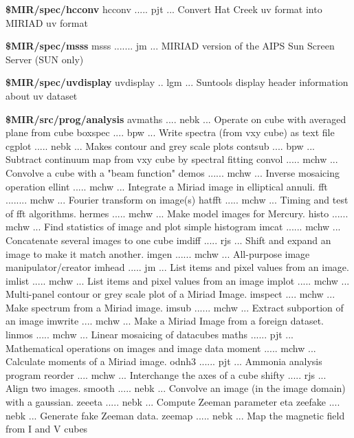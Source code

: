\par{\bf \$MIR/spec/hcconv}
{\eightpoint\begintt
hcconv ..... pjt  ... Convert Hat Creek uv format into MIRIAD uv format 
\endtt}
\par{\bf \$MIR/spec/msss}
{\eightpoint\begintt
msss ....... jm   ... MIRIAD version of the AIPS Sun Screen Server (SUN only) 
\endtt}
\par{\bf \$MIR/spec/uvdisplay}
{\eightpoint\begintt
uvdisplay .. lgm  ... Suntools display header information about uv dataset 
\endtt}
\par{\bf \$MIR/src/prog/analysis}
{\eightpoint\begintt
avmaths .... nebk ... Operate on cube with averaged plane from cube 
boxspec .... bpw  ... Write spectra (from vxy cube) as text file 
cgplot ..... nebk ... Makes contour and grey scale plots 
contsub .... bpw  ... Subtract continuum map from vxy cube by spectral fitting 
convol ..... mchw ... Convolve a cube with a "beam function" 
\endtt}
{\eightpoint\begintt
demos ...... mchw ... Inverse mosaicing operation 
ellint ..... mchw ... Integrate a Miriad image in elliptical annuli. 
fft ........ mchw ... Fourier transform on image(s) 
hatfft ..... mchw ... Timing and test of fft algorithms. 
hermes ..... mchw ... Make model images for Mercury. 
\endtt}
{\eightpoint\begintt
histo ...... mchw ... Find statistics of image and plot simple histogram 
imcat ...... mchw ... Concatenate several images to one cube 
imdiff ..... rjs  ... Shift and expand an image to make it match another. 
imgen ...... mchw ... All-purpose image manipulator/creator 
imhead ..... jm   ... List items and pixel values from an image. 
\endtt}
{\eightpoint\begintt
imlist ..... mchw ... List items and pixel values from an image 
implot ..... mchw ... Multi-panel contour or grey scale plot of a Miriad Image. 
imspect .... mchw ... Make spectrum from a Miriad image.
imsub ...... mchw ... Extract subportion of an image 
imwrite .... mchw ... Make a Miriad Image from a foreign dataset.
\endtt}
{\eightpoint\begintt
linmos ..... mchw ... Linear mosaicing of datacubes 
maths ...... pjt  ... Mathematical operations on images and image data 
moment ..... mchw ... Calculate moments of a Miriad image. 
odnh3 ...... pjt  ... Ammonia analysis program 
reorder .... mchw ... Interchange the axes of a cube 
\endtt}
{\eightpoint\begintt
shifty ..... rjs  ... Align two images. 
smooth ..... nebk ... Convolve an image (in the image domain) with a gaussian. 
zeeeta ..... nebk ... Compute Zeeman parameter eta 
zeefake .... nebk ... Generate fake Zeeman data. 
zeemap ..... nebk ... Map the magnetic field from I and V cubes 
\endtt}
